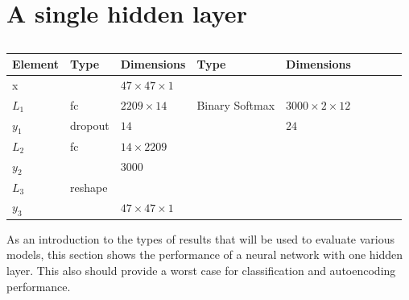 \section{A single hidden layer}
\begin{table}[h!]
\centering
{\footnotesize
\begin{tabular}{|lllllllll|}
\hline
\multicolumn{1}{|l|}{Element} & Type     & \multicolumn{1}{l|}{Dimensions}                     & Type     & \multicolumn{1}{l|}{Dimensions}                      \\ \hline
\multicolumn{1}{|l|}{x}       &          & \multicolumn{1}{l|}{$47\times47\times1$}            &          & \multicolumn{1}{l|}{}                                \\ \hline
\multicolumn{1}{|l|}{$L_1$}   & fc       & \multicolumn{1}{l|}{$2209\times14$}              & Binary Softmax & \multicolumn{1}{l|}{$3000\times2\times12$}        \\
\multicolumn{1}{|l|}{$y_1$}   & dropout  & \multicolumn{1}{l|}{$14$}                         &          & \multicolumn{1}{l|}{$24$}                              \\ \hline
\multicolumn{1}{|l|}{$L_2$}   & fc       & \multicolumn{1}{l|}{$14\times2209$}              &          & \multicolumn{1}{l|}{}                                   \\
\multicolumn{1}{|l|}{$y_2$}   &          & \multicolumn{1}{l|}{$3000$}                         &          & \multicolumn{1}{l|}{}                                \\ \hline
\multicolumn{1}{|l|}{$L_3$}   & reshape & \multicolumn{1}{l|}{}                    &          & \multicolumn{1}{l|}{}                                \\
\multicolumn{1}{|l|}{$y_3$}   &          & \multicolumn{1}{l|}{$47\times47\times 1$}          &          & \multicolumn{1}{l|}{}                                \\ \hline
\end{tabular}

\caption{} \label{net:simple1}

}
\end{table}
As an introduction to the types of results that will be used to evaluate various
models, this section shows the performance of a neural network with one
hidden layer. This also should provide a worst case for classification and autoencoding performance.

